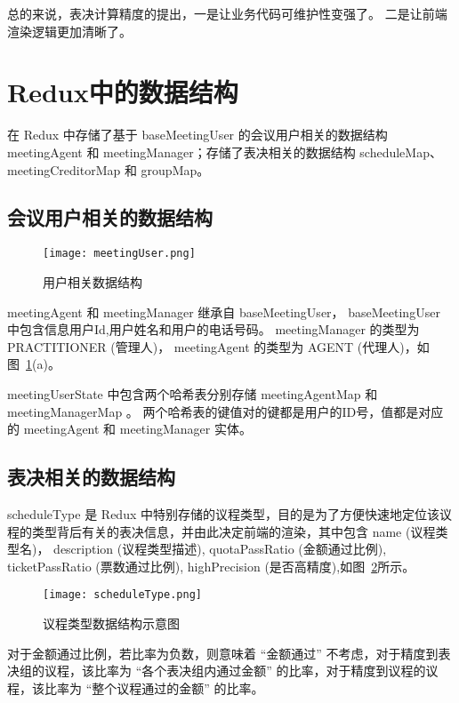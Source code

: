   总的来说，表决计算精度的提出，一是让业务代码可维护性变强了。
  二是让前端渲染逻辑更加清晰了。

  \section{Redux中的数据结构}

  在 Redux 中存储了基于 baseMeetingUser 的会议用户相关的数据结构 meetingAgent 和 meetingManager；存储了表决相关的数据结构 scheduleMap、meetingCreditorMap 和 groupMap。

  \subsection{会议用户相关的数据结构}


  \begin{figure}[!htp]
    \centering
    \texttt{[image: meetingUser.png]}
    \caption{用户相关数据结构}
    \label{fig:meetingUser}
  \end{figure}

  meetingAgent 和 meetingManager 继承自 baseMeetingUser， baseMeetingUser 中包含信息用户Id,用户姓名和用户的电话号码。 meetingManager 的类型为 PRACTITIONER (管理人)， meetingAgent 的类型为 AGENT (代理人)，如图~\ref{fig:meetingUser}(a)。

  meetingUserState 中包含两个哈希表分别存储 meetingAgentMap 和
  meetingManagerMap 。 两个哈希表的键值对的键都是用户的ID号，值都是对应的 meetingAgent 和 meetingManager 实体。

  \subsection{表决相关的数据结构}

  scheduleType 是 Redux 中特别存储的议程类型，目的是为了方便快速地定位该议程的类型背后有关的表决信息，并由此决定前端的渲染，其中包含 name (议程类型名)， description (议程类型描述), quotaPassRatio (金额通过比例), ticketPassRatio (票数通过比例), highPrecision (是否高精度),如图~\ref{fig:scheduleType}所示。

  \begin{figure}[!htp]
    \centering
    \texttt{[image: scheduleType.png]}
    \caption{议程类型数据结构示意图}
    \label{fig:scheduleType}
  \end{figure}

  对于金额通过比例，若比率为负数，则意味着 “金额通过” 不考虑，对于精度到表决组的议程，该比率为 “各个表决组内通过金额” 的比率，对于精度到议程的议程，该比率为 “整个议程通过的金额” 的比率。

